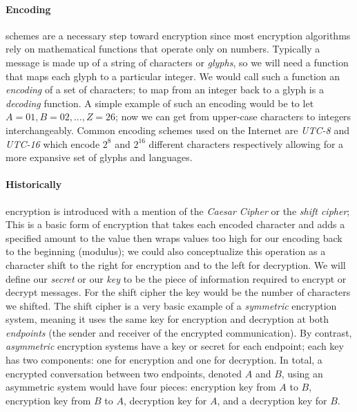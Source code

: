 \documentclass[12pt]{article}
\theoremstyle{remark}
\begin{document}
\paragraph{Encoding} schemes are a necessary step toward encryption since most encryption algorithms rely on mathematical functions that operate only on numbers.  Typically a message is made up of a string of characters or \textit{glyphs}, so we will need a function that maps each glyph to a particular integer.  We would call such a function an \textit{encoding} of a set of characters; to map from an integer back to a glyph is a \textit{decoding} function.  A simple example of such an encoding would be to let $A=01,B=02,...,Z=26$; now we can get from upper-case characters to integers interchangeably.  Common encoding schemes used on the Internet are \textit{UTC-8} and \textit{UTC-16} which encode $2^8$ and $2^{16}$ different characters respectively allowing for a more expansive set of glyphs and languages.

\paragraph{Historically} encryption is introduced with a mention of the \textit{Caesar Cipher} or the \textit{shift cipher}; This is a basic form of encryption that takes each encoded character and adds a specified amount to the value then wraps values too high for our encoding back to the beginning (modulus); we could also conceptualize this operation as a character shift to the right for encryption and to the left for decryption.  We will define our \textit{secret} or our \textit{key} to be the piece of information required to encrypt or decrypt messages.  For the shift cipher the key would be the number of characters we shifted.  The shift cipher is a very basic example of a \textit{symmetric} encryption system, meaning it uses the same key for encryption and decryption at both \textit{endpoints} (the sender and receiver of the encrypted communication).  By contrast, \textit{asymmetric} encryption systems have a key or secret for each endpoint; each key has two components: one for encryption and one for decryption.  In total, a encrypted conversation between two endpoints, denoted $A$ and $B$, using an asymmetric system would have four pieces: encryption key from $A$ to $B$, encryption key from $B$ to $A$, decryption key for $A$, and a decryption key for $B$.
\end{document}
